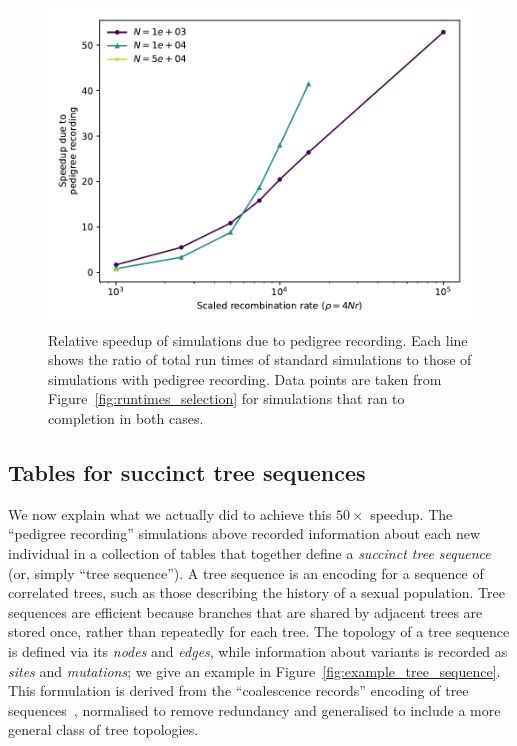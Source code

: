 \documentclass{article}
\begin{document}
\begin{figure}
    \includegraphics[]{sims/speedup}
    \caption{
        \label{fig:relative_speedup_selection}
        Relative speedup of simulations due to pedigree recording.
        Each line shows the ratio of total run times of standard simulations to
        those of simulations with pedigree recording.
        Data points are taken from Figure~\ref{fig:runtimes_selection}
        for simulations that ran to completion in both cases.
    }
\end{figure}




\subsection*{Tables for succinct tree sequences}

We now explain what we actually did to achieve this $50\times$ speedup.
The ``pedigree recording'' simulations above recorded information about each new individual
in a collection of tables that together define a \emph{succinct tree sequence}
(or, simply ``tree sequence'').
A {tree sequence} is an encoding for a sequence of correlated trees,
such as those describing the history of a sexual population.
Tree sequences are efficient because branches that are shared by adjacent trees are stored once,
rather than repeatedly for each tree.
The topology of a tree sequence is defined via its \emph{nodes} and \emph{edges},
while information about variants is recorded as \emph{sites} and \emph{mutations};
we give an example in Figure~\ref{fig:example_tree_sequence}.
This formulation is derived from the ``coalescence records'' encoding of tree
sequences~\citep{kelleher2016efficient}, normalised to remove redundancy
and generalised to include a more general class of tree topologies.
\end{document}
